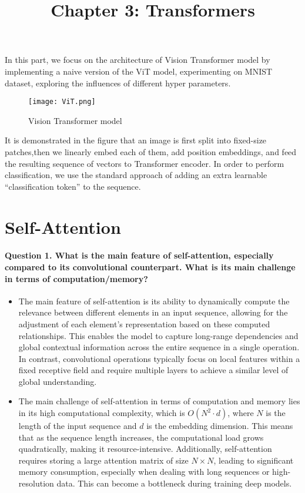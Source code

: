 \documentclass{article}
\title{Chapter 3: Transformers}
\begin{document}
\maketitle
In this part, we focus on the architecture of Vision Transformer model by implementing  a naive version of the ViT model, experimenting on MNIST dataset, exploring the influences of different hyper parameters.

\begin{figure}[H]
    \centering
    \texttt{[image: ViT.png]}
    \caption{Vision Transformer model}
    \label{fig:enter-label}
\end{figure}
It is demonstrated in the figure that an image is first split into fixed-size patches,then we  linearly embed each of them, add position embeddings, and feed the resulting sequence of vectors to  Transformer encoder. In order to perform classification, we use the standard approach of adding an extra learnable “classification token” to the sequence. 

\section{Self-Attention}
\paragraph{Question 1. What is the main feature of self-attention, especially compared to its convolutional counterpart. What is its main challenge in terms of computation/memory? }
\begin{itemize}
    \item The main feature of self-attention is its ability to dynamically compute the relevance between different elements in an input sequence, allowing for the adjustment of each element's representation based on these computed relationships. This enables the model to capture long-range dependencies and global contextual information across the entire sequence in a single operation. In contrast, convolutional operations typically focus on local features within a fixed receptive field and require multiple layers to achieve a similar level of global understanding. 
\end{itemize}
\begin{itemize}
    \item The main challenge of self-attention in terms of computation and memory lies in its high computational complexity, which is \(O(N^2 \cdot d)\), where \(N\) is the length of the input sequence and \(d\) is the embedding dimension. This means that as the sequence length increases, the computational load grows quadratically, making it resource-intensive. Additionally, self-attention requires storing a large attention matrix of size \(N \times N\), leading to significant memory consumption, especially when dealing with long sequences or high-resolution data. This can become a bottleneck during training deep models.
\end{itemize}
\end{document}
